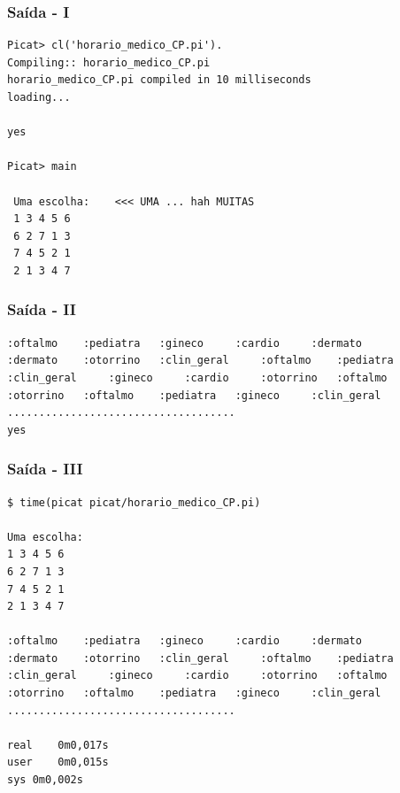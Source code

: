 \documentclass{beamer}
\begin{document}
\begin{frame}[fragile]

\frametitle{Saída - I}

\begin{footnotesize}
\begin{verbatim}
Picat> cl('horario_medico_CP.pi').
Compiling:: horario_medico_CP.pi
horario_medico_CP.pi compiled in 10 milliseconds
loading...

yes

Picat> main                       

 Uma escolha:    <<< UMA ... hah MUITAS
 1 3 4 5 6 
 6 2 7 1 3 
 7 4 5 2 1 
 2 1 3 4 7
\end{verbatim}
  
\end{footnotesize}
\end{frame}


\begin{frame}[fragile]

\frametitle{Saída - II}

\begin{footnotesize}
\begin{verbatim}
:oftalmo 	:pediatra 	:gineco 	:cardio 	:dermato 	
:dermato 	:otorrino 	:clin_geral 	:oftalmo 	:pediatra 	
:clin_geral 	:gineco 	:cardio 	:otorrino 	:oftalmo 	
:otorrino 	:oftalmo 	:pediatra 	:gineco 	:clin_geral 	
....................................
yes
\end{verbatim}
  
\end{footnotesize}
\end{frame}

\begin{frame}[fragile]

\frametitle{Saída - III}

\begin{footnotesize}
\begin{verbatim}
$ time(picat picat/horario_medico_CP.pi)

Uma escolha:
1 3 4 5 6 
6 2 7 1 3 
7 4 5 2 1 
2 1 3 4 7 

:oftalmo 	:pediatra 	:gineco 	:cardio 	:dermato 	
:dermato 	:otorrino 	:clin_geral 	:oftalmo 	:pediatra 	
:clin_geral 	:gineco 	:cardio 	:otorrino 	:oftalmo 	
:otorrino 	:oftalmo 	:pediatra 	:gineco 	:clin_geral 	
....................................

real	0m0,017s
user	0m0,015s
sys	0m0,002s
\end{verbatim}
  
\end{footnotesize}
\end{frame}
\end{document}
